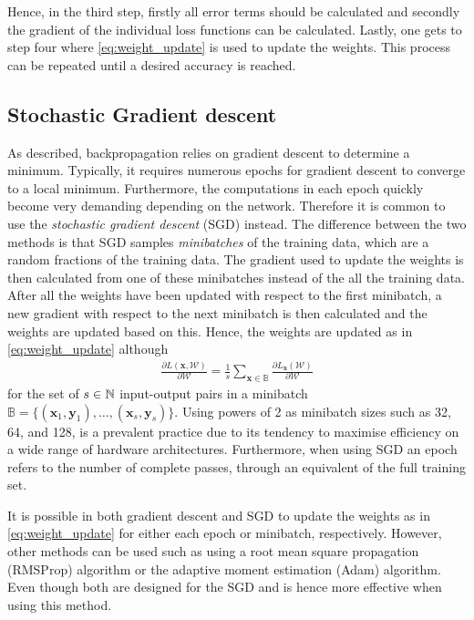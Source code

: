 Hence, in the third step, firstly all error terms should be calculated and secondly the gradient of the individual loss functions can be calculated. Lastly, one gets to step four where \eqref{eq:weight_update} is used to update the weights. This process can be repeated until a desired accuracy is reached.


\subsection{Stochastic Gradient descent}
As described, backpropagation relies on gradient descent to determine a minimum. Typically, it requires numerous epochs for gradient descent to converge to a local minimum. Furthermore, the computations in each epoch quickly become very demanding depending on the network. Therefore it is common to use the \emph{stochastic gradient descent} (SGD) instead. The difference between the two methods is that SGD samples \emph{minibatches} of the training data, which are a random fractions of the training data. The gradient used to update the weights is then calculated from one of these minibatches instead of the all the training data. After all the weights have been updated with respect to the first minibatch, a new gradient with respect to the next minibatch is then calculated and the weights are updated based on this. Hence, the weights are updated as in \eqref{eq:weight_update} although
\begin{align*}
    \frac{\partial L(\bm{x}, \mathcal{W})}{\partial \mathcal{W}} =  \frac{1}{s} \sum_{\bm x \in \mathbb{B}} \frac{\partial L_{\bm{x}}(\mathcal{W})}{\partial \mathcal{W}}
\end{align*}
for the set of $s\in\mathbb{N}$ input-output pairs in a minibatch $\mathbb{B} = \{(\bm{x}_1,\bm{y}_1), \ldots, (\bm{x}_s,\bm{y}_s)\}$. Using powers of 2 as minibatch sizes such as 32, 64, and 128, is a prevalent practice due to its tendency to maximise efficiency on a wide range of hardware architectures. Furthermore, when using SGD an epoch refers to the number of complete passes, through an equivalent of the full training set.

It is possible in both gradient descent and SGD to update the weights as in \eqref{eq:weight_update} for either each epoch or minibatch, respectively. However, other methods can be used such as using a root mean square propagation (RMSProp) algorithm or the adaptive moment estimation (Adam) algorithm. Even though both are designed for the SGD and is hence more effective when using this method. 

